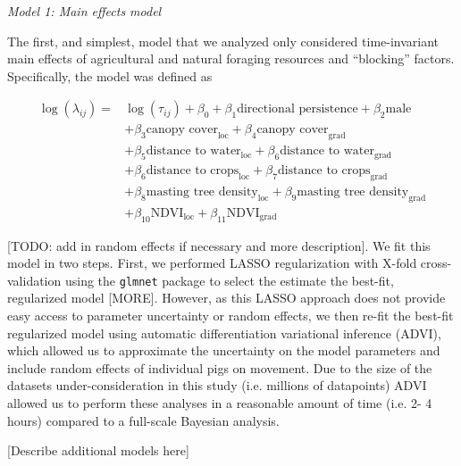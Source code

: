 \documentclass[a4paper]{article}
\begin{document}
\noindent
\emph{Model 1: Main effects model}

The first, and simplest, model that we analyzed only considered time-invariant main effects of agricultural and natural foraging resources and ``blocking'' factors.  Specifically, the model was defined as

\begin{align}
  \log(\lambda_{ij}) = & \log(\tau_{ij}) + \beta_0 +  \beta_1 \text{directional persistence} + \beta_2 \text{male  } \\
  & + \beta_{3} \text{canopy cover}_{\text{loc}} + \beta_{4} \text{canopy cover}_{\text{grad}} \\
  & + \beta_5 \text{distance to water}_{\text{loc}} + \beta_6 \text{distance to water}_{\text{grad}} \\
  & + \beta_6\text{distance to crops}_{\text{loc}} + \beta_7\text{distance to crops}_{\text{grad}} \\
  & + \beta_8\text{masting tree density}_{\text{loc}} + \beta_9\text{masting tree density}_{\text{grad}} \\
  & + \beta_{10}\text{NDVI}_{\text{loc}} + \beta_{11}\text{NDVI}_{\text{grad}}
\end{align}

[TODO: add in random effects if necessary and more description].  We fit this model in two steps.  First, we performed LASSO regularization with X-fold cross-validation using the \texttt{glmnet} package to select the estimate the best-fit, regularized model [MORE]. However, as this LASSO approach does not provide easy access to parameter uncertainty or random effects, we then re-fit the best-fit regularized model using automatic differentiation variational inference (ADVI), which allowed us to approximate the uncertainty on the model parameters and include random effects of individual pigs on movement.  Due to the size of the datasets under-consideration in this study (i.e. millions of datapoints) ADVI allowed us to perform these analyses in a reasonable amount of time (i.e. 2- 4 hours) compared to a full-scale Bayesian analysis.

[Describe additional models here]

\end{document}
